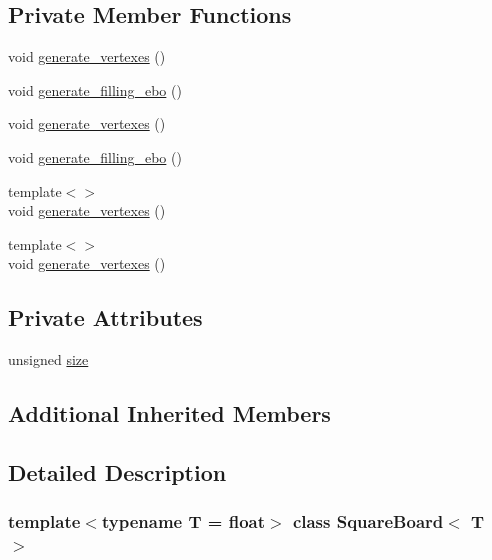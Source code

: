 \subsection*{Private Member Functions}
\begin{DoxyCompactItemize}
\item 
void \mbox{\hyperlink{classSquareBoard_a401c48fa5977d166b75e94bb7ddf1db7}{generate\+\_\+vertexes}} ()
\item 
void \mbox{\hyperlink{classSquareBoard_a5d12432cc063275a6ffec42a7971abbc}{generate\+\_\+filling\+\_\+ebo}} ()
\item 
void \mbox{\hyperlink{classSquareBoard_a401c48fa5977d166b75e94bb7ddf1db7}{generate\+\_\+vertexes}} ()
\item 
void \mbox{\hyperlink{classSquareBoard_a5d12432cc063275a6ffec42a7971abbc}{generate\+\_\+filling\+\_\+ebo}} ()
\item 
{\footnotesize template$<$$>$ }\\void \mbox{\hyperlink{classSquareBoard_a7928f781c7709b3fdfe42b5ce5bfc3f9}{generate\+\_\+vertexes}} ()
\item 
{\footnotesize template$<$$>$ }\\void \mbox{\hyperlink{classSquareBoard_a7928f781c7709b3fdfe42b5ce5bfc3f9}{generate\+\_\+vertexes}} ()
\end{DoxyCompactItemize}
\subsection*{Private Attributes}
\begin{DoxyCompactItemize}
\item 
unsigned \mbox{\hyperlink{classSquareBoard_a92007159761cd4dfe85aaaa11103ea84}{size}}
\end{DoxyCompactItemize}
\subsection*{Additional Inherited Members}


\subsection{Detailed Description}
\subsubsection*{template$<$typename T = float$>$\newline
class Square\+Board$<$ T $>$}

